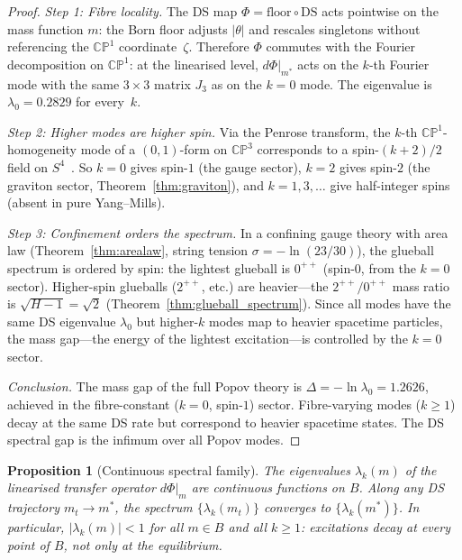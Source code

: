 \documentclass[11pt,a4paper]{article}
\newtheorem{proposition}[theorem]{Proposition}
\theoremstyle{definition}
\theoremstyle{remark}
\newcommand{\CP}{\mathbb{CP}}
\begin{document}
\begin{proof}
\emph{Step 1: Fibre locality.} The DS map $\Phi=\mathrm{floor}\circ\mathrm{DS}$ acts pointwise on the mass function $m$: the Born floor adjusts $|\theta|$ and rescales singletons without referencing the $\CP^1$ coordinate~$\zeta$. Therefore $\Phi$ commutes with the Fourier decomposition on $\CP^1$: at the linearised level, $d\Phi|_{m^*}$ acts on the $k$-th Fourier mode with the same $3\times 3$ matrix $J_3$ as on the $k=0$ mode. The eigenvalue is $\lambda_0=0.2829$ for every~$k$.

\emph{Step 2: Higher modes are higher spin.} Via the Penrose transform, the $k$-th $\CP^1$-homogeneity mode of a $(0,1)$-form on $\CP^3$ corresponds to a spin-$(k+2)/2$ field on $S^4$~\cite{Penrose1967, MasonWoodhouse}. So $k=0$ gives spin-$1$ (the gauge sector), $k=2$ gives spin-$2$ (the graviton sector, Theorem~\ref{thm:graviton}), and $k=1,3,\ldots$ give half-integer spins (absent in pure Yang--Mills).

\emph{Step 3: Confinement orders the spectrum.} In a confining gauge theory with area law (Theorem~\ref{thm:arealaw}, string tension $\sigma=-\ln(23/30)$), the glueball spectrum is ordered by spin: the lightest glueball is $0^{++}$ (spin-$0$, from the $k=0$ sector). Higher-spin glueballs ($2^{++}$, etc.) are heavier---the $2^{++}/0^{++}$ mass ratio is $\sqrt{H-1}=\sqrt{2}$ (Theorem~\ref{thm:glueball_spectrum}). Since all modes have the same DS eigenvalue $\lambda_0$ but higher-$k$ modes map to heavier spacetime particles, the mass gap---the energy of the lightest excitation---is controlled by the $k=0$ sector.

\emph{Conclusion.} The mass gap of the full Popov theory is $\Delta=-\ln\lambda_0=1.2626$, achieved in the fibre-constant ($k=0$, spin-$1$) sector. Fibre-varying modes ($k\geq 1$) decay at the same DS rate but correspond to heavier spacetime states. The DS spectral gap is the infimum over all Popov modes.
\end{proof}

\begin{proposition}[Continuous spectral family]\label{prop:continuous_spectrum}
The eigenvalues $\lambda_k(m)$ of the linearised transfer operator $d\Phi|_m$ are continuous functions on $B$. Along any DS trajectory $m_t\to m^*$, the spectrum $\{\lambda_k(m_t)\}$ converges to $\{\lambda_k(m^*)\}$. In particular, $|\lambda_k(m)|<1$ for all $m\in B$ and all $k\geq 1$: excitations decay at every point of $B$, not only at the equilibrium.
\end{proposition}
\end{document}
